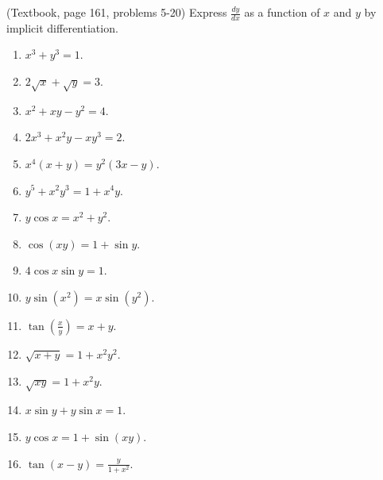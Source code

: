 \begin{problem} (Textbook, page 161, problems 5-20) Express $\frac{dy}{dx}$ as a function of $x$ and $y$ by implicit differentiation.
\begin{multicols}{3}
\begin{enumerate}
\item $x^3+y^3=1$.
\item $ 2\sqrt x+\sqrt y=3$.
\item $ x^2+x y-y^2=4$.
\item $ 2x^3+x^2y-x y^3=2$.
\item $ x^4(x+y)=y^2(3x-y)$.
\item $ y^5+x^2y^3=1+x^4y $.
\item $ y\cos x=x^2+y^2 $.
\item $ \cos (x y)=1+\sin y$.
\item $ 4\cos x\sin y=1$.
\item $ y\sin (x^2)=x\sin (y^2)$.
\item $ \tan \left(\frac{x}{y}\right)=x+y$.
\item $ \sqrt{x+y}=1+x^2y^2$.
\item $ \sqrt{xy}=1+x^2 y$.
\item $ x\sin y+y\sin x=1$.
\item $ y\cos x=1+\sin (x y)$.
\item $ \tan (x-y)=\frac{y}{1+x^2}$.
\end{enumerate}
\end{multicols}
\end{problem}